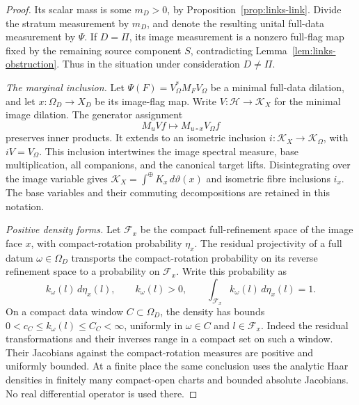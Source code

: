\begin{proof}
Its scalar mass is some \(m_D>0\), by
Proposition~\ref{prop:links-link}. Divide the stratum measurement
by \(m_D\), and denote the resulting unital full-data measurement
by \(\Psi\). If \(D=\Pi\), its image measurement is a
nonzero full-flag map fixed by the remaining source component
\(S\), contradicting Lemma~\ref{lem:links-obstruction}.
Thus in the situation under consideration \(D\ne\Pi\).

\emph{The marginal inclusion.}
Let
\(\Psi(F)=V_\Omega^*M_FV_\Omega\) be a minimal full-data
dilation, and let \(x:\Omega_D\to X_D\) be its image-flag map.
Write \(V:\mathcal H\to\mathcal K_X\) for the minimal image
dilation. The generator assignment
\[
 M_uVf\longmapsto M_{u\circ x}V_\Omega f
\]
preserves inner products. It extends to an isometric inclusion
\(i:\mathcal K_X\to\mathcal K_\Omega\), with
\(iV=V_\Omega\). This inclusion intertwines the image spectral
measure, base multiplication, all companions, and the canonical
target lifts. Disintegrating over the image variable gives
\(\mathcal K_X=\int^\oplus K_x\,d\vartheta(x)\) and
isometric fibre inclusions \(i_x\). The base variables and their
commuting decompositions are retained in this notation.

\emph{Positive density forms.}
Let \(\mathcal F_x\) be the compact full-refinement space of the
image face \(x\), with compact-rotation probability \(\eta_x\).
The residual projectivity of a full datum \(\omega\in\Omega_D\)
transports the compact-rotation probability on its reverse
refinement space to a probability on \(\mathcal F_x\). Write
this probability as
\[
 k_\omega(l)\,d\eta_x(l),\qquad
 k_\omega(l)>0,\qquad
 \int_{\mathcal F_x}k_\omega(l)\,d\eta_x(l)=1.
\]
On a compact data window \(C\subset\Omega_D\), the density
has bounds \(0<c_C\leq k_\omega(l)\leq C_C<\infty\), uniformly
in \(\omega\in C\) and \(l\in\mathcal F_x\).
Indeed the residual transformations and their inverses range in
a compact set on such a window. Their Jacobians against the
compact-rotation measures are positive and uniformly bounded.
At a finite place the same conclusion uses the analytic Haar
densities in finitely many compact-open charts and bounded
absolute Jacobians. No real differential operator is used there.


\end{proof}
